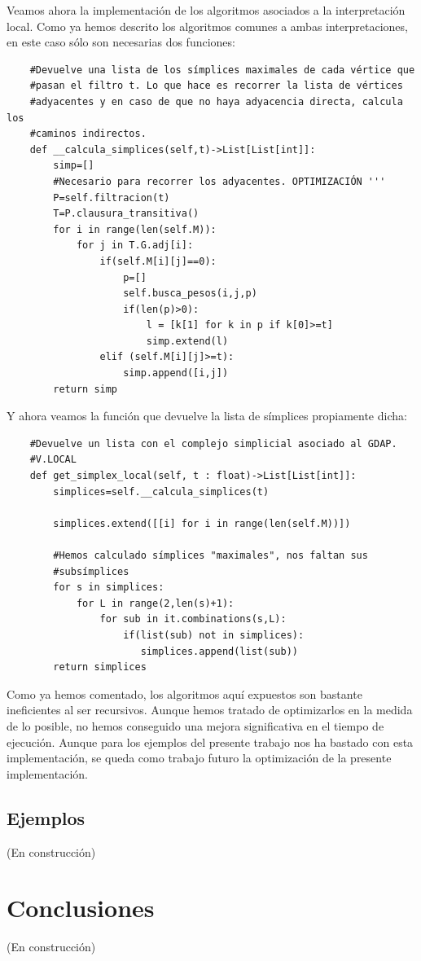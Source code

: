 \documentclass[12pt, a4paper, twoside]{book}
\numberwithin{equation}{section}
\theoremstyle{definition}
\theoremstyle{remark}
\theoremstyle{plain}
\begin{document}
	Veamos ahora la implementación de los algoritmos asociados a la 
	interpretación local. Como ya hemos descrito los algoritmos comunes a 
	ambas interpretaciones, en este caso sólo son necesarias dos 
	funciones: 
	\begin{verbatim}
	#Devuelve una lista de los símplices maximales de cada vértice que 
	#pasan el filtro t. Lo que hace es recorrer la lista de vértices 
	#adyacentes y en caso de que no haya adyacencia directa, calcula los 
	#caminos indirectos.
	def __calcula_simplices(self,t)->List[List[int]]:
        simp=[]
        #Necesario para recorrer los adyacentes. OPTIMIZACIÓN '''
        P=self.filtracion(t)
        T=P.clausura_transitiva()
        for i in range(len(self.M)):
            for j in T.G.adj[i]:
                if(self.M[i][j]==0):
                    p=[]
                    self.busca_pesos(i,j,p)
                    if(len(p)>0):
                        l = [k[1] for k in p if k[0]>=t]
                        simp.extend(l)
                elif (self.M[i][j]>=t):
                    simp.append([i,j])
        return simp
	\end{verbatim}
	Y ahora veamos la función que devuelve la lista de símplices 
	propiamente dicha:
	\begin{verbatim}
	#Devuelve un lista con el complejo simplicial asociado al GDAP. 
	#V.LOCAL
	def get_simplex_local(self, t : float)->List[List[int]]:
        simplices=self.__calcula_simplices(t)
        
        simplices.extend([[i] for i in range(len(self.M))])
        
        #Hemos calculado símplices "maximales", nos faltan sus 
        #subsímplices
        for s in simplices:
            for L in range(2,len(s)+1):
                for sub in it.combinations(s,L):
                    if(list(sub) not in simplices):
                       simplices.append(list(sub))
        return simplices
	\end{verbatim}

	Como ya hemos comentado, los algoritmos aquí expuestos son bastante 
	ineficientes al ser recursivos. Aunque hemos tratado de optimizarlos 
	en la medida de lo posible, no hemos conseguido una mejora 
	significativa en el tiempo de ejecución. Aunque para los ejemplos del 
	presente trabajo nos ha bastado con esta implementación, se queda como
	trabajo futuro la optimización de la presente implementación.
	
	\section{Ejemplos}
	(En construcción)
	\chapter{Conclusiones}
	(En construcción)
	\nocite{*}
	
	
\end{document}

